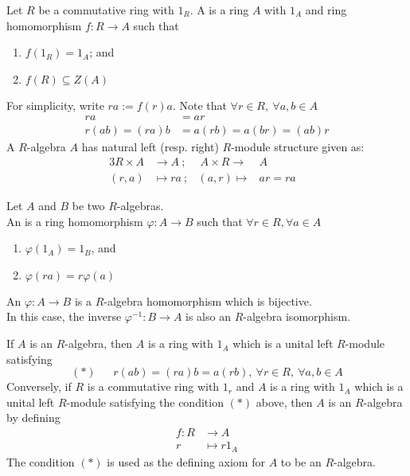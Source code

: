 \begin{definition}
Let $R$ be a commutative ring with $1_R$. A  is a ring $A$ with $1_A$ and ring homomorphism $f: R \rightarrow A$ such that
\begin{enumerate}[label=(\roman*)]
\item $f(1_R) = 1_A$; and
\item $f(R) \subseteq Z(A)$
\end{enumerate}
For simplicity, write $ra := f(r)a$.
Note that $\forall r \in R, \ \forall a, b \in A$
\begin{align}
ra &= ar \nonumber \\
r(ab) = (ra)b &= a(rb) = a(br) = (ab)r \nonumber
\end{align}
A $R$-algebra $A$ has natural left (resp. right) $R$-module structure given as:
\begin{alignat}{3}
R \times A &\rightarrow A \ ; &\ A \times R \rightarrow& A& \nonumber \\
(r, a) &\mapsto ra\  ; &(a,r) \mapsto& ar = ra& \nonumber
\end{alignat}
\end{definition}

\begin{definition}
Let $A$ and $B$ be two $R$-algebras.\\
An  is a ring homomorphism $\varphi: A \rightarrow B$ such that $\forall r \in R, \forall a \in A$
\begin{enumerate}[label=(\roman*)]
\item $\varphi(1_A) = 1_B$, and
\item $\varphi(ra) = r \varphi(a)$
\end{enumerate}
An  $\varphi: A \rightarrow B$ is a $R$-algebra homomorphism which is bijective.\\
In this case, the inverse $\varphi^{-1}: B \rightarrow A$ is also an $R$-algebra isomorphism.
\end{definition}

\begin{remark}
If $A$ is an $R$-algebra, then $A$ is a ring with $1_A$ which is a unital left $R$-module satisfying
\begin{equation}
(*) \ \ \ \ \ \ \ r(ab) = (ra)b = a(rb), \ \forall r\in R, \ \forall a,b \in A \nonumber
\end{equation}
Conversely, if $R$ is a commutative ring with $1_r$ and $A$ is a ring with $1_A$ which is a unital left $R$-module satisfying the condition $(*)$ above, then $A$ is an $R$-algebra by defining
\begin{align}
f: R &\rightarrow A \nonumber \\
r &\mapsto r 1_A \nonumber
\end{align}
The condition $(*)$ is used as the defining axiom for $A$ to be an $R$-algebra.
\end{remark}


